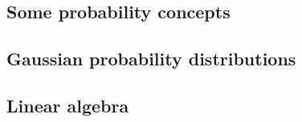 \documentclass[../main.tex]{subfiles}
\begin{document}
\subsection{Some probability concepts}


\subsection{Gaussian probability distributions}


\subsection{Linear algebra}

\end{document}
